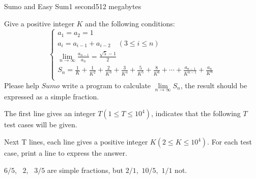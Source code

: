 \documentclass[11pt,a4paper,oneside]{article}
\begin{document}
\begin{problem}{Sumo and Easy Sum}{}{}{1 second}{512 megabytes}
	
	Give a positive integer $K$ and the following conditions:
	$$
	\begin{cases}
	a_1=a_2=1\\
	a_i=a_{i-1}+a_{i-2} \quad (3\leq i\leq n)\\
	\lim\limits_{n\rightarrow\infty}\frac{a_{n-1}}{a_{n}}=\frac{\sqrt{5}-1}{2}\\
	S_n=\frac{1}{K}+\frac{1}{K^2}+\frac{2}{K^3}+\frac{3}{K^4}+\frac{5}{K^5}+\frac{8}{K^6}+\cdots+\frac{a_{n-1}}{K^{n-1}}+\frac{a_n}{K^n}\\
	\end{cases}
	$$
	Please help $Sumo$ write a program to calculate $\lim\limits_{n\rightarrow\infty}S_n$, the result should be expressed as a simple fraction.
	
	\InputFile
	The first line gives an integer $T(1 \leq T \leq 10^4)$, indicates that the following $T$ test cases will be given.
	
	Next T lines, each line gives a positive integer $K$$(2 \leq K \leq 10^4)$.
	\OutputFile
	For each test case, print a line to express the answer.
	\Examples
	\begin{example}
	\end{example}
	\Note
	$6/5$, \ $2$, \ $3/5$ are simple fractions, but $2/1$,\ $10/5$,\ $1/1$ not. 
\end{problem}
\end{document}
